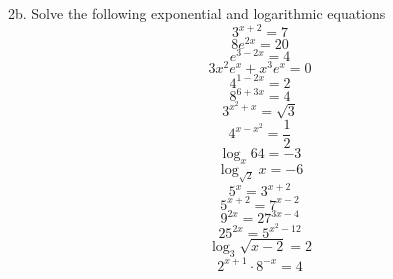 \documentclass[11pt]{article}
\begin{document}
2b. Solve the following exponential and logarithmic equations
\begin{equation}
  \label{eq:faeyeije}
  3^{x+2}=7
\end{equation}
\begin{equation}
  \label{eq:ochedoxi}
  8e^{2x}=20
\end{equation}
\begin{equation}
  \label{eq:veipoeyu}
  e^{3-2x}=4
\end{equation}
\begin{equation}
  \label{eq:aquusahm}
  3x^{2}e^{x}+x^{3}e^{x}=0
\end{equation}
  \begin{equation}
    \label{eq:rohkiine}
    4^{1-2x}=2
  \end{equation}
  \begin{equation}
    \label{eq:zahsuini}
    8^{6+3x}=4
  \end{equation}
  \begin{equation}
    \label{eq:iaphaeya}
    3^{x^{2}+x}=\sqrt{3}
  \end{equation}
  \begin{equation}
    \label{eq:iebaiviu}
    4^{x-x^{2}}=\frac{1}{2}
  \end{equation}
  \begin{equation}
    \label{eq:maareiju}
    \log_{x}64=-3
  \end{equation}
  \begin{equation}
    \label{eq:sheuroov}
    \log_{\sqrt{2}}x=-6
  \end{equation}
  \begin{equation}
    \label{eq:dairithe}
    5^{x}=3^{x+2}
  \end{equation}
  \begin{equation}
    \label{eq:seizieng}
    5^{x+2}=7^{x-2}
  \end{equation}
  \begin{equation}
    \label{eq:ceivapuw}
    9^{2x}=27^{3x-4}
  \end{equation}
  \begin{equation}
    \label{eq:eefohvoh}
    25^{2x}=5^{x^{2}-12}
  \end{equation}
  \begin{equation}
    \label{eq:xiefepib}
    \log_{3}\sqrt{x-2}=2
  \end{equation}
  \begin{equation}
    \label{eq:eegaifah}
    2^{x+1}\cdot{}8^{-x}=4
  \end{equation}
\end{document}
